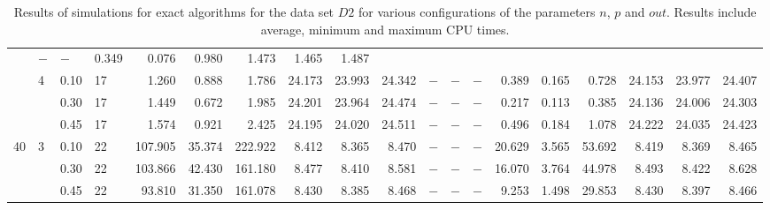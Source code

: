 \documentclass[thesis=B,english]{FITthesis}[2012/10/20]
\begin{document}
\begin{table}[h!]
\begin{adjustbox}{angle=90}
{\begin{tabular}{l|l|l|l|r|r|r|r|r|r|r|r|r|r|r|r|r|r|r|}
&     $-$ &     $-$ &       0.349 &  0.076 &   0.980 &       1.473 &   1.465 &   1.487 \\   & 4 & 0.10 & 17 &    1.260 &   0.888 &    1.786 &  24.173 &  23.993 &  24.342 &     $-$ &     $-$ &     $-$ &       0.389 &  0.165 &   0.728 &      24.153 &  23.977 &  24.407 \\   &   & 0.30 & 17 &    1.449 &   0.672 &    1.985 &  24.201 &  23.964 &  24.474 &     $-$ &     $-$ &     $-$ &       0.217 &  0.113 &   0.385 &      24.136 &  24.006 &  24.303 \\   &   & 0.45 & 17 &    1.574 &   0.921 &    2.425 &  24.195 &  24.020 &  24.511 &     $-$ &     $-$ &     $-$ &       0.496 &  0.184 &   1.078 &      24.222 &  24.035 &  24.423 \\40 & 3 & 0.10 & 22 &  107.905 &  35.374 &  222.922 &   8.412 &   8.365 &   8.470 &     $-$ &     $-$ &     $-$ &      20.629 &  3.565 &  53.692 &       8.419 &   8.369 &   8.465 \\   &   & 0.30 & 22 &  103.866 &  42.430 &  161.180 &   8.477 &   8.410 &   8.581 &     $-$ &     $-$ &     $-$ &      16.070 &  3.764 &  44.978 &       8.493 &   8.422 &   8.628 \\   &   & 0.45 & 22 &   93.810 &  31.350 &  161.078 &   8.430 &   8.385 &   8.468 &     $-$ &     $-$ &     $-$ &       9.253 &  1.498 &  29.853 &       8.430 &   8.397 &   8.466 \\
			 \hline 
			\end{tabular} 
			
			
			
			}
			
\end{adjustbox}
    
    \caption{Results of simulations for exact algorithms for the data set $D2$ for various configurations of the parameters $n$, $p$ and $out$. Results include average, minimum and maximum CPU times.}
    \label{table:exact:2}
\end{table}
\end{document}
